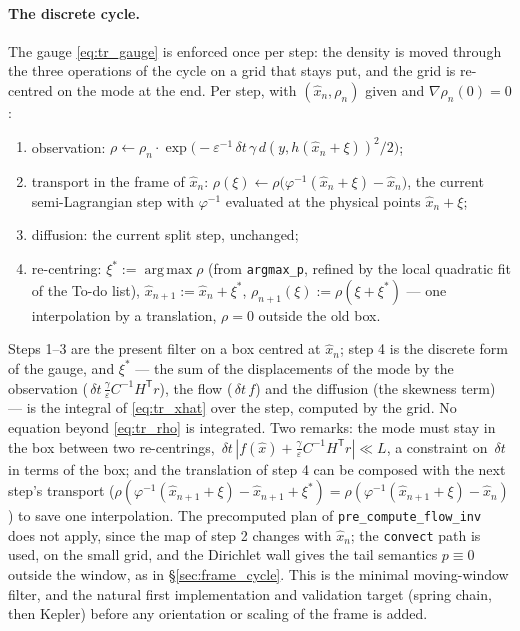 \documentclass[11pt,a4paper]{article}
\newcommand{\argmax}{\operatorname{arg\,max}}
\newcommand{\T}{^{\mathsf T}}
\newcommand{\xh}{\hat{x}}
\newcommand{\eps}{\varepsilon}
\newcommand{\abs}[1]{\left\lvert #1 \right\rvert}
\newcommand{\grad}{\nabla}
\newcommand{\dt}{\,\delta t}
\theoremstyle{plain}
\theoremstyle{definition}
\theoremstyle{remark}
\begin{document}
\paragraph{The discrete cycle.}
The gauge \eqref{eq:tr_gauge} is enforced once per step: the density is moved through the three operations of the cycle on a grid that stays put, and the grid is re-centred on the mode at the end. Per step, with $(\xh_n,\rho_n)$ given and $\grad\rho_n(0)=0$:
\begin{enumerate}[leftmargin=1.5em,nosep]
  \item observation: $\rho\leftarrow\rho_n\cdot\exp\big(-\eps^{-1}\dt\,\gamma\,d(y,h(\xh_n+\xi))^2/2\big)$;
  \item transport in the frame of $\xh_n$: $\rho(\xi)\leftarrow\rho\big(\varphi^{-1}(\xh_n+\xi)-\xh_n\big)$, the current semi-Lagrangian step with $\varphi^{-1}$ evaluated at the physical points $\xh_n+\xi$;
  \item diffusion: the current split step, unchanged;
  \item re-centring: $\xi^*:=\argmax\rho$ (from \texttt{argmax\_p}, refined by the local quadratic fit of the To-do list), $\xh_{n+1}:=\xh_n+\xi^*$, $\rho_{n+1}(\xi):=\rho(\xi+\xi^*)$ --- one interpolation by a translation, $\rho=0$ outside the old box.
\end{enumerate}
Steps 1--3 are the present filter on a box centred at $\xh_n$; step 4 is the discrete form of the gauge, and $\xi^*$ --- the sum of the displacements of the mode by the observation ($\dt\,\tfrac\gamma\eps C^{-1}H\T r$), the flow ($\dt\,f$) and the diffusion (the skewness term) --- is the integral of \eqref{eq:tr_xhat} over the step, computed by the grid. No equation beyond \eqref{eq:tr_rho} is integrated. Two remarks: the mode must stay in the box between two re-centrings, $\dt\,\abs{f(\xh)+\tfrac\gamma\eps C^{-1}H\T r}\ll L$, a constraint on $\dt$ in terms of the box; and the translation of step 4 can be composed with the next step's transport ($\rho(\varphi^{-1}(\xh_{n+1}+\xi)-\xh_{n+1}+\xi^*) = \rho(\varphi^{-1}(\xh_{n+1}+\xi)-\xh_n)$) to save one interpolation. The precomputed plan of \texttt{pre\_compute\_flow\_inv} does not apply, since the map of step 2 changes with $\xh_n$; the \texttt{convect} path is used, on the small grid, and the Dirichlet wall gives the tail semantics $p\equiv0$ outside the window, as in \S\ref{sec:frame_cycle}. This is the minimal moving-window filter, and the natural first implementation and validation target (spring chain, then Kepler) before any orientation or scaling of the frame is added.
\end{document}
